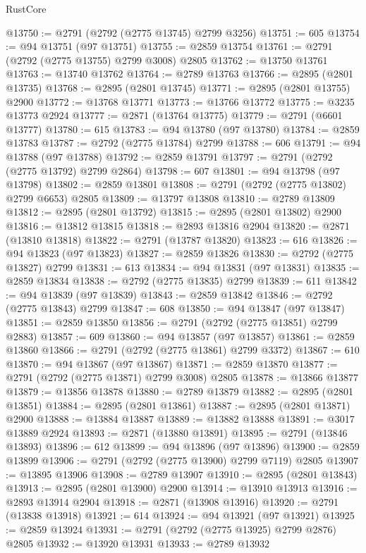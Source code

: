 \begin{lexlean}{RustCore}
\begin{coremodule}
@13750 := @2791 (@2792 (@2775 @13745) @2799 @3256)
@13751 := 605
@13754 := @94 @13751 (@97 @13751)
@13755 := @2859 @13754
@13761 := @2791 (@2792 (@2775 @13755) @2799 @3008) @2805
@13762 := @13750 @13761
@13763 := @13740 @13762
@13764 := @2789 @13763
@13766 := @2895 (@2801 @13735)
@13768 := @2895 (@2801 @13745)
@13771 := @2895 (@2801 @13755) @2900
@13772 := @13768 @13771
@13773 := @13766 @13772
@13775 := @3235 @13773 @2924
@13777 := @2871 (@13764 @13775)
@13779 := @2791 (@6601 @13777)
@13780 := 615
@13783 := @94 @13780 (@97 @13780)
@13784 := @2859 @13783
@13787 := @2792 (@2775 @13784) @2799
@13788 := 606
@13791 := @94 @13788 (@97 @13788)
@13792 := @2859 @13791
@13797 := @2791 (@2792 (@2775 @13792) @2799 @2864)
@13798 := 607
@13801 := @94 @13798 (@97 @13798)
@13802 := @2859 @13801
@13808 := @2791 (@2792 (@2775 @13802) @2799 @6653) @2805
@13809 := @13797 @13808
@13810 := @2789 @13809
@13812 := @2895 (@2801 @13792)
@13815 := @2895 (@2801 @13802) @2900
@13816 := @13812 @13815
@13818 := @2893 @13816 @2904
@13820 := @2871 (@13810 @13818)
@13822 := @2791 (@13787 @13820)
@13823 := 616
@13826 := @94 @13823 (@97 @13823)
@13827 := @2859 @13826
@13830 := @2792 (@2775 @13827) @2799
@13831 := 613
@13834 := @94 @13831 (@97 @13831)
@13835 := @2859 @13834
@13838 := @2792 (@2775 @13835) @2799
@13839 := 611
@13842 := @94 @13839 (@97 @13839)
@13843 := @2859 @13842
@13846 := @2792 (@2775 @13843) @2799
@13847 := 608
@13850 := @94 @13847 (@97 @13847)
@13851 := @2859 @13850
@13856 := @2791 (@2792 (@2775 @13851) @2799 @2883)
@13857 := 609
@13860 := @94 @13857 (@97 @13857)
@13861 := @2859 @13860
@13866 := @2791 (@2792 (@2775 @13861) @2799 @3372)
@13867 := 610
@13870 := @94 @13867 (@97 @13867)
@13871 := @2859 @13870
@13877 := @2791 (@2792 (@2775 @13871) @2799 @3008) @2805
@13878 := @13866 @13877
@13879 := @13856 @13878
@13880 := @2789 @13879
@13882 := @2895 (@2801 @13851)
@13884 := @2895 (@2801 @13861)
@13887 := @2895 (@2801 @13871) @2900
@13888 := @13884 @13887
@13889 := @13882 @13888
@13891 := @3017 @13889 @2924
@13893 := @2871 (@13880 @13891)
@13895 := @2791 (@13846 @13893)
@13896 := 612
@13899 := @94 @13896 (@97 @13896)
@13900 := @2859 @13899
@13906 := @2791 (@2792 (@2775 @13900) @2799 @7119) @2805
@13907 := @13895 @13906
@13908 := @2789 @13907
@13910 := @2895 (@2801 @13843)
@13913 := @2895 (@2801 @13900) @2900
@13914 := @13910 @13913
@13916 := @2893 @13914 @2904
@13918 := @2871 (@13908 @13916)
@13920 := @2791 (@13838 @13918)
@13921 := 614
@13924 := @94 @13921 (@97 @13921)
@13925 := @2859 @13924
@13931 := @2791 (@2792 (@2775 @13925) @2799 @2876) @2805
@13932 := @13920 @13931
@13933 := @2789 @13932

\end{coremodule}
\end{lexlean}
